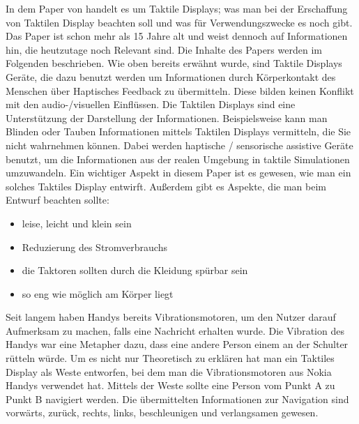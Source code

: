 
In dem Paper von \cite{gemperle2001design} handelt es um Taktile Displays; 
was man bei der Erschaffung von Taktilen Display beachten soll und was f{\"u}r Verwendungszwecke es noch gibt. 
Das Paper ist schon mehr als 15 Jahre alt und weist dennoch auf Informationen hin, die heutzutage noch Relevant sind. 
Die Inhalte des Papers werden im Folgenden beschrieben.
Wie oben bereits erw{\"a}hnt wurde, sind Taktile Displays Ger{\"a}te, die dazu benutzt werden um Informationen durch K{\"o}rperkontakt des Menschen {\"u}ber Haptisches Feedback zu {\"u}bermitteln. Diese bilden keinen Konflikt mit den audio-/visuellen Einfl{\"u}ssen. 
Die Taktilen Displays sind eine Unterst{\"u}tzung der Darstellung der Informationen. 
Beispielsweise kann man Blinden oder Tauben Informationen mittels Taktilen Displays vermitteln, die Sie nicht wahrnehmen k{\"o}nnen.
Dabei werden haptische / sensorische assistive Ger{\"a}te benutzt, um die Informationen aus der realen Umgebung in taktile Simulationen umzuwandeln.
Ein wichtiger Aspekt in diesem Paper ist es gewesen, wie man ein solches Taktiles Display entwirft.
Au{\ss}erdem gibt es Aspekte, die man beim Entwurf beachten sollte:
\begin{itemize}
\item leise, leicht und klein sein
\item Reduzierung des Stromverbrauchs
\item die Taktoren sollten durch die Kleidung sp{\"u}rbar sein
\item so eng wie m{\"o}glich am K{\"o}rper liegt
\end{itemize}
Seit langem haben Handys bereits Vibrationsmotoren, um den Nutzer darauf Aufmerksam zu machen, falls eine Nachricht erhalten wurde.
Die Vibration des Handys war eine Metapher dazu, dass eine andere Person einem an der Schulter r{\"u}tteln w{\"u}rde. \cite{gemperle2001design} 
Um es nicht nur Theoretisch zu erkl{\"a}ren hat man ein Taktiles Display als Weste entworfen, bei dem man die Vibrationsmotoren aus Nokia Handys verwendet hat. Mittels der Weste sollte eine Person vom Punkt A zu Punkt B navigiert werden. 
Die {\"u}bermittelten Informationen zur Navigation sind vorw{\"a}rts, zur{\"u}ck, rechts, links, beschleunigen und verlangsamen gewesen. 